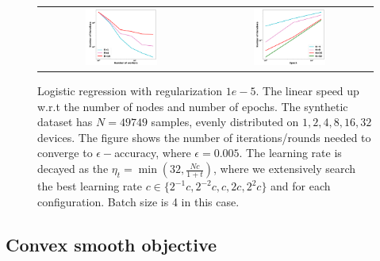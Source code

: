 \begin{figure}[h!]
\centering
\begin{tabular}{cc}
	\includegraphics[width=0.45\textwidth]{fig/paper-stronglycvxsmthspeedupNodesT-min-w8a-epsilon0131-reg1e-05.pdf} & 
\includegraphics[width=0.45\textwidth]{fig/paper-stronglycvxsmthspeedupEpochsT-min-w8a-epsilon0131-reg1e-05.pdf} \\
\end{tabular}
	\caption{Logistic regression with regularization $1e-5$. The linear speed up w.r.t the number of nodes and number of epochs. The synthetic dataset has $N=49749$ samples, evenly distributed on $1, 2, 4, 8, 16, 32$ devices. The figure shows the number of iterations/rounds needed to converge to $\epsilon-$accuracy, where $\epsilon=0.005$. The learning rate is decayed as the $\eta_t = \min(32, \frac{Nc}{1 + t})$, where we extensively search the best learning rate $c \in \{2^{-1}c, 2^{-2}c, c, 2c, 2^{2}c\}$ and for each configuration. Batch size is 4 in this case.}
\end{figure}



\subsection{Convex smooth objective}

